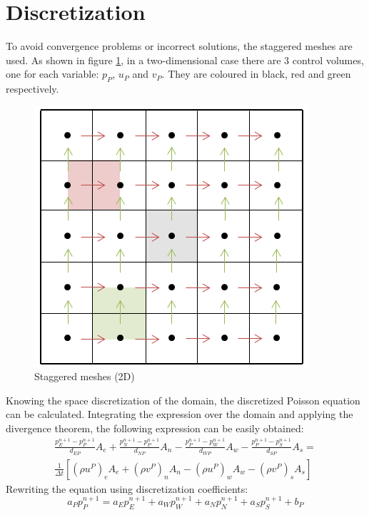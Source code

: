 \section{Discretization}
To avoid convergence problems or incorrect solutions, the staggered meshes are used. As shown in figure \ref{staggered}, in a two-dimensional case there are 3 control volumes, one for each variable: $p_{P}$, $u_{P}$ and $v_{P}$. They are coloured in black, red and green respectively.
\begin{figure}
	\centering
	\includegraphics[scale=0.8]{DrivenCavity/staggered}
	\caption{Staggered meshes (2D)}
	\label{staggered}
\end{figure}
Knowing the space discretization of the domain, the discretized Poisson equation can be calculated. Integrating the expression over the domain and applying the divergence theorem, the following expression can be easily obtained:
\begin{equation}
\begin{aligned}
\frac{p_{E}^{n+1}-p_{P}^{n+1}}{d_{EP}}A_{e}+\frac{p_{N}^{n+1}-p_{P}^{n+1}}{d_{NP}}A_{n}-\frac{p_{P}^{n+1}-p_{W}^{n+1}}{d_{WP}}A_{w}-\frac{p_{P}^{n+1}-p_{S}^{n+1}}{d_{SP}}A_{s}= \\
\frac{1}{\Delta t}\left[\left(\rho u^{P}\right)_{e}A_{e}+\left(\rho v^{P}\right)_{n}A_{n}-\left(\rho u^{P}\right)_{w}A_{w}-\left(\rho v^{P}\right)_{s}A_{s}\right]
\end{aligned}
\end{equation}
Rewriting the equation using discretization coefficients:
\begin{equation}
a_{P}p_{P}^{n+1}=a_{E}p_{E}^{n+1}+a_{W}p_{W}^{n+1}+a_{N}p_{N}^{n+1}+a_{S}p_{S}^{n+1}+b_{P}
\end{equation}
